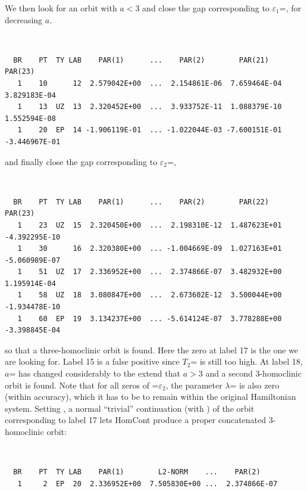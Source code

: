 We then look for an orbit with $a<3$ and close the gap corresponding 
to $\varepsilon_1$=, for decreasing $a$.
\begin{center}
\\
\end{center}
\begin{verbatim}
  BR    PT  TY LAB    PAR(1)      ...    PAR(2)        PAR(21)       PAR(23)       
   1    10      12  2.579042E+00  ...  2.154861E-06  7.659464E-04  3.829183E-04  
   1    13  UZ  13  2.320452E+00  ...  3.933752E-11  1.088379E-10  1.552594E-08
   1    20  EP  14 -1.906119E-01  ... -1.022044E-03 -7.600151E-01 -3.446967E-01
\end{verbatim}
and finally close the gap corresponding to $\varepsilon_2$=,
\begin{center}
\\
\end{center}
\begin{verbatim}
  BR    PT  TY LAB    PAR(1)      ...    PAR(2)        PAR(22)       PAR(23)   
   1    23  UZ  15  2.320450E+00  ...  2.198310E-12  1.487623E+01 -4.392295E-10
   1    30      16  2.320380E+00  ... -1.004669E-09  1.027163E+01 -5.060989E-07
   1    51  UZ  17  2.336952E+00  ...  2.374866E-07  3.482932E+00  1.195914E-04
   1    58  UZ  18  3.080847E+00  ...  2.673602E-12  3.500044E+00 -1.934478E-10
   1    60  EP  19  3.134237E+00  ... -5.614124E-07  3.778288E+00 -3.398845E-04
\end{verbatim}
so that a three-homoclinic orbit is found. Here the zero at label
17 is the one we are looking for. Label 15 is a false positive since
$T_2$= is still too high. At label 18, $a$= 
has changed
considerably to the extend that $a>3$ and a second 3-homoclinic orbit 
is found. Note that for all zeros of =$\varepsilon_2$, the
parameter $\lambda$= is also zero (within \AUTO accuracy), 
which it has to be to remain
within the original Hamiltonian system.
Setting , a normal ``trivial'' continuation (with )
of the orbit corresponding to label 17 
lets {\cal HomCont} produce a proper concatenated
3-homoclinic orbit:
\begin{center}
\\
\end{center}
\begin{verbatim}
  BR    PT  TY LAB    PAR(1)        L2-NORM    ...    PAR(2)    
   1     2  EP  20  2.336952E+00  7.505830E+00 ...  2.374866E-07
\end{verbatim}
